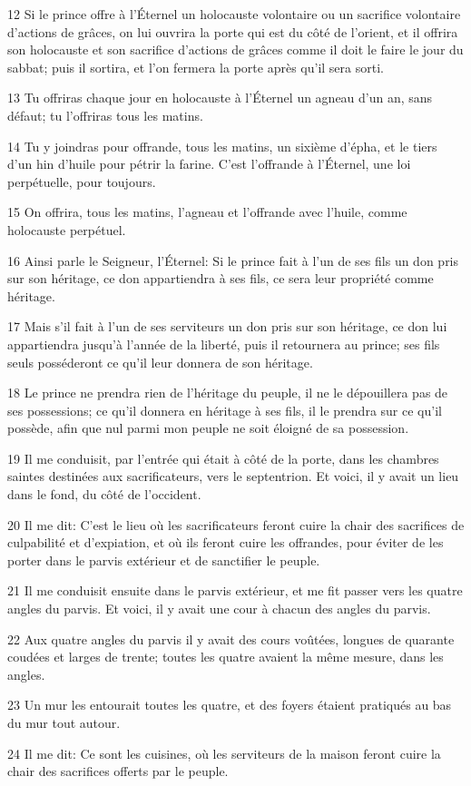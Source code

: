 \par 12 Si le prince offre à l'Éternel un holocauste volontaire ou un sacrifice volontaire d'actions de grâces, on lui ouvrira la porte qui est du côté de l'orient, et il offrira son holocauste et son sacrifice d'actions de grâces comme il doit le faire le jour du sabbat; puis il sortira, et l'on fermera la porte après qu'il sera sorti.
\par 13 Tu offriras chaque jour en holocauste à l'Éternel un agneau d'un an, sans défaut; tu l'offriras tous les matins.
\par 14 Tu y joindras pour offrande, tous les matins, un sixième d'épha, et le tiers d'un hin d'huile pour pétrir la farine. C'est l'offrande à l'Éternel, une loi perpétuelle, pour toujours.
\par 15 On offrira, tous les matins, l'agneau et l'offrande avec l'huile, comme holocauste perpétuel.
\par 16 Ainsi parle le Seigneur, l'Éternel: Si le prince fait à l'un de ses fils un don pris sur son héritage, ce don appartiendra à ses fils, ce sera leur propriété comme héritage.
\par 17 Mais s'il fait à l'un de ses serviteurs un don pris sur son héritage, ce don lui appartiendra jusqu'à l'année de la liberté, puis il retournera au prince; ses fils seuls posséderont ce qu'il leur donnera de son héritage.
\par 18 Le prince ne prendra rien de l'héritage du peuple, il ne le dépouillera pas de ses possessions; ce qu'il donnera en héritage à ses fils, il le prendra sur ce qu'il possède, afin que nul parmi mon peuple ne soit éloigné de sa possession.
\par 19 Il me conduisit, par l'entrée qui était à côté de la porte, dans les chambres saintes destinées aux sacrificateurs, vers le septentrion. Et voici, il y avait un lieu dans le fond, du côté de l'occident.
\par 20 Il me dit: C'est le lieu où les sacrificateurs feront cuire la chair des sacrifices de culpabilité et d'expiation, et où ils feront cuire les offrandes, pour éviter de les porter dans le parvis extérieur et de sanctifier le peuple.
\par 21 Il me conduisit ensuite dans le parvis extérieur, et me fit passer vers les quatre angles du parvis. Et voici, il y avait une cour à chacun des angles du parvis.
\par 22 Aux quatre angles du parvis il y avait des cours voûtées, longues de quarante coudées et larges de trente; toutes les quatre avaient la même mesure, dans les angles.
\par 23 Un mur les entourait toutes les quatre, et des foyers étaient pratiqués au bas du mur tout autour.
\par 24 Il me dit: Ce sont les cuisines, où les serviteurs de la maison feront cuire la chair des sacrifices offerts par le peuple.

